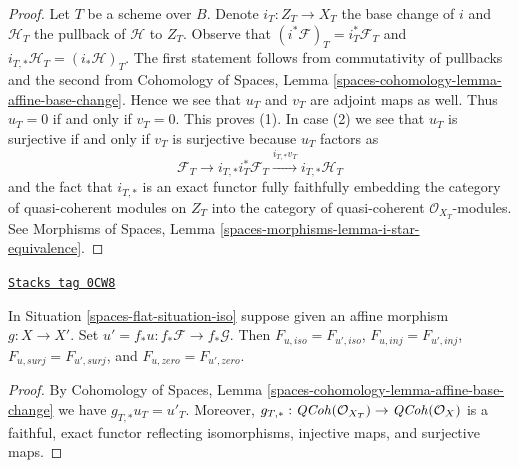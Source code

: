 \begin{proof}
Let $T$ be a scheme over $B$. Denote $i_T : Z_T \to X_T$
the base change of $i$ and $\mathcal{H}_T$ the pullback of $\mathcal{H}$
to $Z_T$. Observe that $(i^*\mathcal{F})_T = i_T^*\mathcal{F}_T$
and $i_{T, *}\mathcal{H}_T = (i_*\mathcal{H})_T$.
The first statement follows from commutativity of pullbacks
and the second from Cohomology of Spaces, Lemma
\ref{spaces-cohomology-lemma-affine-base-change}.
Hence we see that $u_T$ and $v_T$ are adjoint maps as well.
Thus $u_T = 0$ if and only if $v_T = 0$. This proves (1).
In case (2) we see that $u_T$ is surjective if and only if
$v_T$ is surjective because $u_T$ factors as
$$
\mathcal{F}_T \to
i_{T, *}i_T^*\mathcal{F}_T \xrightarrow{i_{T, *}v_T} i_{T, *}\mathcal{H}_T
$$
and the fact that $i_{T, *}$ is an exact functor
fully faithfully embedding the category of quasi-coherent modules on
$Z_T$ into the category of quasi-coherent $\mathcal{O}_{X_T}$-modules.
See Morphisms of Spaces, Lemma \ref{spaces-morphisms-lemma-i-star-equivalence}.
\end{proof}

\begin{lemma}
\label{spaces-flat-lemma-relate-zero-affine-push}
\href{https://stacks.math.columbia.edu/tag/0CW8}{\texttt{Stacks tag 0CW8}}

In Situation \ref{spaces-flat-situation-iso} suppose given an affine morphism
$g : X \to X'$. Set $u' = f_*u : f_*\mathcal{F} \to f_*\mathcal{G}$.
Then $F_{u, iso} = F_{u', iso}$, $F_{u, inj} = F_{u', inj}$,
$F_{u, surj} = F_{u', surj}$, and $F_{u, zero} = F_{u', zero}$.
\end{lemma}

\begin{proof}
By Cohomology of Spaces, Lemma
\ref{spaces-cohomology-lemma-affine-base-change}
we have $g_{T, *}u_T = u'_T$.
Moreover, $g_{T, *} : \mathit{QCoh}(\mathcal{O}_{X_T}) \to \mathit{QCoh}(\mathcal{O}_X)$
is a faithful, exact functor reflecting isomorphisms, injective maps,
and surjective maps.
\end{proof}

